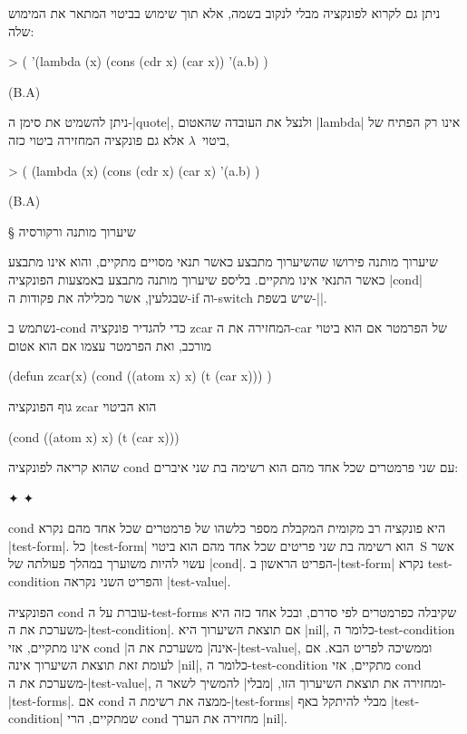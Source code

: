 \documentclass[a4paper,12pt,reqno]{article}
\begin{document}
ניתן גם לקרוא לפונקציה מבלי לנקוב בשמה, אלא תוך שימוש בביטוי המתאר את המימוש
שלה:
\begin{LISP}
> (
    '(lambda (x)
      (cons (cdr x) (car x))
    '(a.b)
)

(B.A)
\end{LISP}
ניתן להשמיט את סימן ה-\E|quote|, ולנצל את העובדה שהאטום \T|lambda| אינו רק
הפתיח של ביטוי~$λ$ אלא גם פונקציה המחזירה ביטוי כזה,
\begin{LISP}
> (
    (lambda (x) (cons (cdr x) (car x)
    '(a.b)
)

(B.A)
\end{LISP}

§ שיערוך מותנה ורקורסיה

שיערוך מותנה פירושו שהשיערוך מתבצע כאשר תנאי מסויים מתקיים, והוא אינו מתבצע
כאשר התנאי אינו מתקיים. בליספ שיערוך מותנה מתבצע באמצעות הפונקציה \E|cond|
שבגלעין, אשר מכלילה את פקודות ה-if וה-switch שיש בשפת-\E|\CPL|.

נשתמש ב-cond כדי להגדיר פונקציה zcar המחזירה את ה-car של הפרמטר אם
הוא ביטוי מורכב, ואת הפרמטר עצמו אם הוא אטום
\begin{LISP}
(defun zcar(x)
  (cond ((atom x) x) (t (car x)))
)
\end{LISP}
גוף הפונקציה zcar הוא הביטוי
\begin{LISP}
  (cond ((atom x) x) (t (car x)))
\end{LISP}
שהוא קריאה לפונקציה cond עם שני פרמטרים שכל אחד מהם הוא רשימה בת שני איברים:
\begin{LTR}
  \begin{itemize}
    ✦ 
    ✦ 
  \end{itemize}
\end{LTR}
cond היא פונקציה רב מקומית המקבלת מספר כלשהו של פרמטרים שכל אחד מהם נקרא
\E|test-form|. כל \E|test-form| הוא רשימה בת שני פריטים שכל אחד מהם הוא ביטוי~S
אשר עשוי להיות משוערך במהלך פעולתה של \E|cond|. הפריט הראשון ב-\E|test-form|
נקרא test-condition והפריט השני נקראה \E|test-value|.

הפונקציה cond עוברת על ה-test-forms שקיבלה כפרמטרים לפי סדרם, ובכל אחד כזה היא
משערכת את ה-\E|test-condition|. אם תוצאת השיערוך היא \E|nil|, כלומר
ה-test-condition אינו מתקיים, אזי cond \ע|אינה| משערכת את ה-\E|test-value|, וממשיכה
לפריט הבא. אם לעומת זאת תוצאת השיערוך אינה \E|nil|, כלומר ה-test-condition
מתקיים, אזי cond משערכת את ה-\E|test-value|, ומחזירה את תוצאת השיערוך הזו, \ע|מבלי|
להמשיך לשאר ה-\E|test-forms|. אם cond ממצה את רשימת ה-\E|test-forms| מבלי
להיתקל באף \E|test-condition| שמתקיים, הרי cond מחזירה את הערך \E|nil|.
\end{document}
